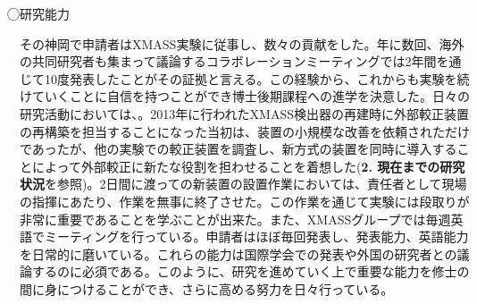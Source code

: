 \documentclass[10pt,a4paper,twoside]{jarticle}
\newcommand{\研究課題名}{XMASS検出器を用いた季節変動による暗黒物質の直接探索}
\newcommand{\研究機関名}{神戸大学}
\newcommand{\申請者氏名}{岡直哉}
\newcommand{\研究代表者氏名}{\申請者氏名}
\newcommand{\研究期間の最終元号年度}{29}	%
\begin{document}
{\textcircled{}研究能力\par
その神岡で申請者はXMASS実験に従事し、数々の貢献をした。年に数回、海外の共同研究者も集まって議論するコラボレーションミーティングでは2年間を通じて10度発表したことがその証拠と言える。この経験から、これからも実験を続けていくことに自信を持つことができ博士後期課程への進学を決意した。日々の研究活動においては、{\bf {}}。2013年に行われたXMASS検出器の再建時に外部較正装置の再構築を担当することになった当初は、装置の小規模な改善を依頼されただけであったが、他の実験での較正装置を調査し、新方式の装置を同時に導入することによって外部較正に新たな役割を担わせることを着想した({\bf 2. 現在までの研究状況}を参照)。2日間に渡っての新装置の設置作業においては、責任者として現場の指揮にあたり、作業を無事に終了させた。この作業を通じて実験には段取りが非常に重要であることを学ぶことが出来た。また、XMASSグループでは毎週英語でミーティングを行っている。申請者はほぼ毎回発表し、発表能力、英語能力を日常的に磨いている。これらの能力は国際学会での発表や外国の研究者との議論するのに必須である。このように、研究を進めていく上で重要な能力を修士の間に身につけることができ、さらに高める努力を日々行っている。


}





\end{document}
